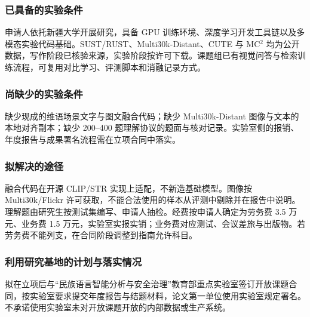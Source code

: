 \justifying
\NSFCBodyText

\subsubsection{已具备的实验条件}

申请人依托新疆大学开展研究，具备 GPU 训练环境、深度学习开发工具链以及多模态实验代码基础。SUST/RUST、Multi30k-Distant、CUTE 与 MC$^2$ 均为公开数据，写作阶段已核验来源，实验阶段按许可下载。课题组已有视觉问答与检索训练流程，可复用对比学习、评测脚本和消融记录方式。

\subsubsection{尚缺少的实验条件}

缺少现成的维语场景文字与图文融合代码；缺少 Multi30k-Distant 图像与文本的本地对齐副本；缺少 200--400 题理解协议的题面与核对记录。实验室侧的报销、年度报告与成果署名流程需在立项合同中落实。

\subsubsection{拟解决的途径}

融合代码在开源 CLIP/STR 实现上适配，不新造基础模型。图像按 Multi30k/Flickr 许可获取，不能合法使用的样本从评测中剔除并在报告中说明。理解题由研究生按测试集编写、申请人抽检。经费按申请人确定为劳务费 3.5 万元、业务费 1.5 万元，实验室实报实销；业务费对应测试、会议差旅与出版物。若劳务费不能列支，在合同阶段调整到指南允许科目。

\subsubsection{利用研究基地的计划与落实情况}

拟在立项后与“民族语言智能分析与安全治理”教育部重点实验室签订开放课题合同，按实验室要求提交年度报告与结题材料，论文第一单位使用实验室规定署名。不承诺使用实验室未对开放课题开放的内部数据或生产系统。
